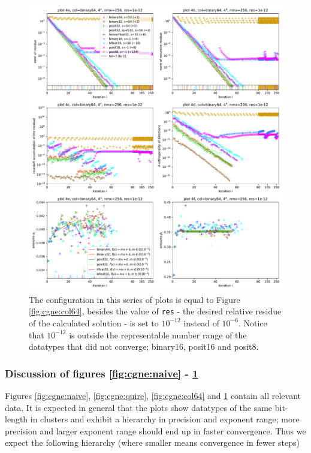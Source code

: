 \documentclass{article}
\theoremstyle{plain} %
\theoremstyle{convention} %
\theoremstyle{remark} %
\def\code#1{\texttt{#1}}
\numberwithin{equation}{section}
\begin{document}
\begin{figure}
    \centering
    \includegraphics[width=1.0\textwidth]{plots/cgne_final_3}
    \caption{The configuration in this series of plots is equal to Figure \ref{fig:cgne:col64}, besides the value of \code{res} - the desired relative residue of the calculated solution - is set to $10^{-12}$ instead of $10^{-6}$. Notice that $10^{-12}$ is outside the representable number range of the datatypes that did not converge; \gls{binary16}, \gls{posit16} and \gls{posit8}.}
    \label{fig:cgne:res12}
\end{figure}

\subsubsection{Discussion of figures \ref{fig:cgne:naive} - \ref{fig:cgne:res12}}

Figures \ref{fig:cgne:naive}, \ref{fig:cgne:quire}, \ref{fig:cgne:col64} and \ref{fig:cgne:res12} contain all relevant data. It is expected in general that the plots show datatypes of the same bit-length in clusters and exhibit a hierarchy in precision and exponent range; more precision and larger exponent range should end up in faster convergence. Thus we expect the following hierarchy (where smaller means convergence in fewer steps)
\end{document}
